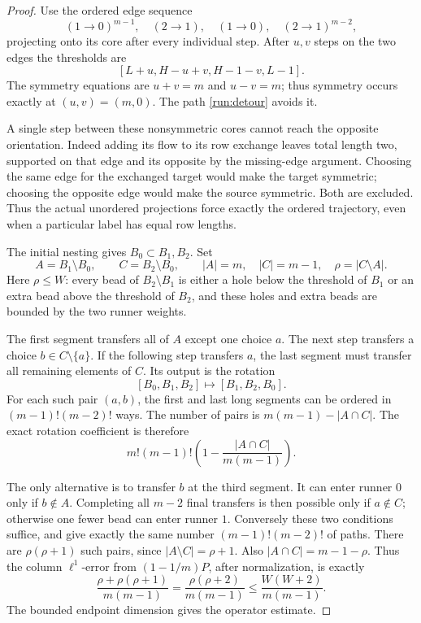 \begin{proof}
Use the ordered edge sequence
\begin{equation}\label{run:detour}
 (1\to0)^{m-1},\quad (2\to1),\quad
 (1\to0),\quad (2\to1)^{m-2},
\end{equation}
projecting onto its core after every individual step.
After \(u,v\) steps on the two edges the thresholds are
\[
 [L+u,H-u+v,H-1-v,L-1].
 \]
The symmetry equations are \(u+v=m\) and \(u-v=m\);
thus symmetry occurs exactly at \((u,v)=(m,0)\).
The path \eqref{run:detour} avoids it.

A single step between these nonsymmetric cores cannot reach
the opposite orientation.  Indeed adding its flow to its
row exchange leaves total length two, supported on that edge
and its opposite by the missing-edge argument.
Choosing the same edge for the exchanged target would make
the target symmetric; choosing the opposite edge would make
the source symmetric.  Both are excluded.  Thus the actual
unordered projections force exactly the ordered trajectory,
even when a particular label has equal row lengths.

The initial nesting gives \(B_0\subset B_1,B_2\).
Set
\[
 A=B_1\setminus B_0,\qquad C=B_2\setminus B_0,\qquad
 |A|=m,\quad |C|=m-1,\quad \rho=|C\setminus A|.
 \]
Here \(\rho\leq W\): every bead of \(B_2\setminus B_1\)
is either a hole below the threshold of \(B_1\) or an extra
bead above the threshold of \(B_2\), and these holes and
extra beads are bounded by the two runner weights.

The first segment transfers all of \(A\) except one choice
\(a\).  The next step transfers a choice
\(b\in C\setminus\{a\}\).
If the following step transfers \(a\), the last segment must
transfer all remaining elements of \(C\).  Its output is
the rotation
\[
 [B_0,B_1,B_2]\longmapsto[B_1,B_2,B_0].
 \]
For each such pair \((a,b)\), the first and last long
segments can be ordered in
\((m-1)!(m-2)!\) ways.  The number of pairs is
\(m(m-1)-|A\cap C|\).  The exact rotation coefficient is
therefore
\begin{equation}\label{run:rotation-count}
 m!(m-1)!
 \left(1-\frac{|A\cap C|}{m(m-1)}\right).
\end{equation}

The only alternative is to transfer \(b\) at the third
segment.  It can enter runner \(0\) only if \(b\notin A\).
Completing all \(m-2\) final transfers is then possible only
if \(a\notin C\); otherwise one fewer bead can enter runner
\(1\).  Conversely these two conditions suffice, and give
exactly the same number \((m-1)!(m-2)!\) of paths.
There are \(\rho(\rho+1)\) such pairs, since
\(|A\setminus C|=\rho+1\).
Also \(|A\cap C|=m-1-\rho\).  Thus the column \(\ell^1\)-error
from \((1-1/m)P\), after normalization, is exactly
\[
 \frac{\rho+\rho(\rho+1)}{m(m-1)}
   =\frac{\rho(\rho+2)}{m(m-1)}
   \leq\frac{W(W+2)}{m(m-1)}.
 \]
The bounded endpoint dimension gives the operator estimate.


\end{proof}
